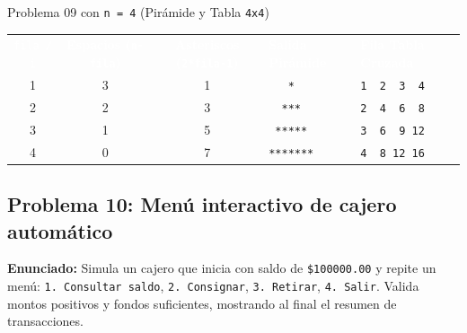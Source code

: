 \documentclass[11pt,letterpaper]{article}
\begin{document}





\begin{pruebaescritorio}{Problema 09 con \texttt{n = 4} (Pirámide y Tabla \texttt{4x4})}
\begin{center}
\footnotesize
\setlength{\tabcolsep}{5pt}
\renewcommand{\arraystretch}{1.15}
\begin{tabularx}{\linewidth}{c c c X X}
\rowcolor{AzulMarino}
\textcolor{white}{\texttt{fila / i}} & \textcolor{white}{\textbf{Espacios (\texttt{n-fila})}} & \textcolor{white}{\textbf{Asteriscos (\texttt{2*fila-1})}} & \textcolor{white}{\textbf{Salida Pirámide}} & \textcolor{white}{\textbf{Fila Tabla Cruzada}} \\
1 & 3 & 1 & \texttt{\ \ \ *} & \texttt{1\ \ 2\ \ 3\ \ 4} \\
2 & 2 & 3 & \texttt{\ \ ***} & \texttt{2\ \ 4\ \ 6\ \ 8} \\
3 & 1 & 5 & \texttt{\ *****} & \texttt{3\ \ 6\ \ 9\ 12} \\
4 & 0 & 7 & \texttt{*******} & \texttt{4\ \ 8\ 12\ 16} \\
\bottomrule
\end{tabularx}
\end{center}
\end{pruebaescritorio}

\subsection{Problema 10: Menú interactivo de cajero automático}

\textbf{Enunciado:} Simula un cajero que inicia con saldo de \texttt{\$100000.00} y repite un menú: \texttt{1. Consultar saldo}, \texttt{2. Consignar}, \texttt{3. Retirar}, \texttt{4. Salir}. Valida montos positivos y fondos suficientes, mostrando al final el resumen de transacciones.
\end{document}
